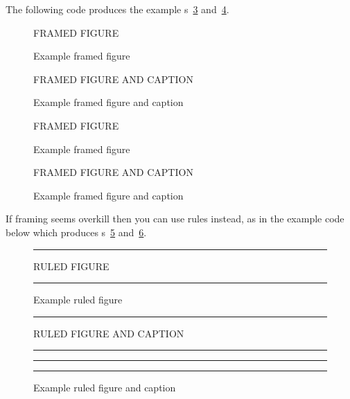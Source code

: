     The following code produces the example 
\figurerefname s~\ref{fig:framef} and~\ref{fig:framefcap}.

\begin{lcode}
\begin{figure}
\centering
\begin{framed}\centering
FRAMED FIGURE
\end{framed}
\caption{Example framed figure}\label{fig:framef}
\end{figure}

\begin{figure}
\begin{framed}\centering
FRAMED FIGURE AND CAPTION
\caption{Example framed figure and caption}\label{fig:framefcap}
\end{framed}
\end{figure}
\end{lcode}

\begin{figure}
\centering
\begin{framed}\centering
FRAMED FIGURE
\end{framed}
\caption{Example framed figure}\label{fig:framef}
\end{figure}

\begin{figure}
\begin{framed}\centering
FRAMED FIGURE AND CAPTION
\caption{Example framed figure and caption}\label{fig:framefcap}
\end{framed}
\end{figure}

    If framing seems overkill then you can use 
rules instead, as in the example code below
which produces 
\figurerefname s~\ref{fig:rulef} and~\ref{fig:rulefcap}.

\begin{lcode}
\begin{figure}
\centering
\hrule\vspace{\onelineskip}
RULED FIGURE
\vspace{\onelineskip}\hrule
\vspace{\onelineskip}
\caption{Example ruled figure}\label{fig:rulef}
\end{figure}

\begin{figure}
\centering
\hrule\vspace{\onelineskip}
RULED FIGURE AND CAPTION
\vspace{\onelineskip}\hrule
\vspace{0.2pt}\hrule
\vspace{\onelineskip}
\caption{Example ruled figure and caption}\label{fig:rulefcap}
\hrule
\end{figure}
\end{lcode}

